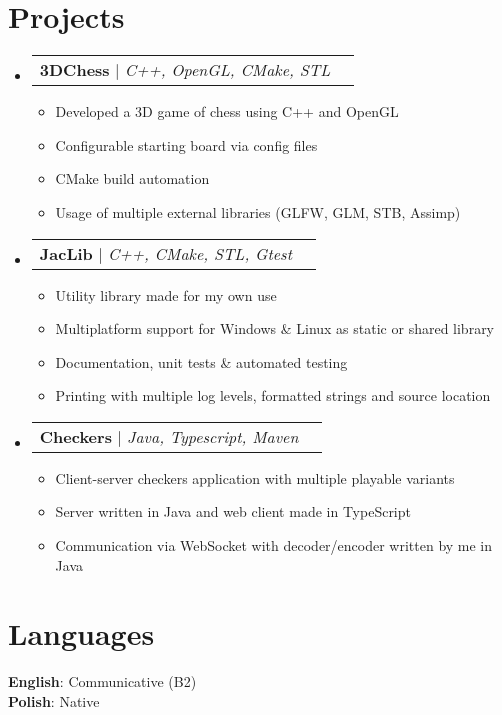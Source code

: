 \documentclass[letterpaper,11pt]{article}
\makeatletter
\newcommand{\resumeItem}[1]{
  \item\small{
    {#1 \vspace{-2pt}}
  }
}
\newcommand{\resumeProjectHeading}[2]{
    \item
    \begin{tabular*}{0.97\textwidth}{l@{\extracolsep{\fill}}r}
      \small#1 & #2 \\
    \end{tabular*}\vspace{-7pt}
}
\newcommand{\resumeSubHeadingListStart}{\begin{itemize}[leftmargin=0.15in, label={}]}
\newcommand{\resumeSubHeadingListEnd}{\end{itemize}}
\newcommand{\resumeItemListStart}{\begin{itemize}}
\newcommand{\resumeItemListEnd}{\end{itemize}\vspace{-5pt}}
\makeatother
\begin{document}
\section{Projects}
    \resumeSubHeadingListStart
        \resumeProjectHeading
            {\textbf{3DChess} $|$ \emph
                {C++, OpenGL, CMake, STL}
            }
            {\small{\href
                {https://github.com/Moztanku/3DChess}
                {\underline{github.com/Moztanku/3DChess}}
            }}
            \resumeItemListStart
                \resumeItem{Developed a 3D game of chess using C++ and OpenGL}
                \resumeItem{Configurable starting board via config files}
                \resumeItem{CMake build automation}
                \resumeItem{Usage of multiple external libraries (GLFW, GLM, STB, Assimp)}
            \resumeItemListEnd

        \resumeProjectHeading
            {\textbf{JacLib} $|$ \emph
                {C++, CMake, STL, Gtest}
            }
            {\small{\href
                {https://github.com/Moztanku/JacLib/}
                {\underline{github.com/Moztanku/JacLib}}
            }}
            \resumeItemListStart
                \resumeItem{Utility library made for my own use}
                \resumeItem{Multiplatform support for Windows \& Linux as static or shared library}
                \resumeItem{Documentation, unit tests \& automated testing}
                \resumeItem{Printing with multiple log levels, formatted strings and source location}
            \resumeItemListEnd
        \resumeProjectHeading
            {\textbf{Checkers} $|$ \emph
                {Java, Typescript, Maven}
            }
            {\small{\href
                {https://github.com/Moztanku/Checkers}
                {\underline{github.com/Moztanku/Checkers}}
            }}
            \resumeItemListStart
                \resumeItem{Client-server checkers application with multiple playable variants}
                \resumeItem{Server written in Java and web client made in TypeScript}
                \resumeItem{Communication via WebSocket with decoder/encoder written by me in Java}
            \resumeItemListEnd
            
    \resumeSubHeadingListEnd

\section{Languages}
    \begin{itemize}[leftmargin=0.15in, label={}]
        \small{\item{
            \textbf{English}{: Communicative (B2)} \\
            \textbf{Polish}{: Native} \\
        }}
    \end{itemize}
%
\end{document}
